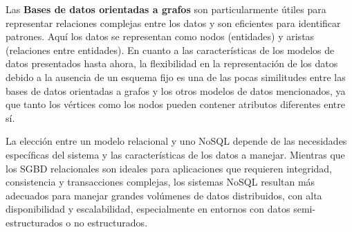 Las \textbf{Bases de datos orientadas a grafos} son particularmente útiles para 
representar relaciones complejas entre los datos y son eficientes para identificar patrones. 
Aquí los datos se representan como nodos (entidades) y aristas 
(relaciones entre entidades). En cuanto a las características de los modelos 
de datos presentados hasta ahora, la flexibilidad en la representación de los datos debido 
a la ausencia de un esquema fijo es una de las pocas similitudes entre las bases de 
datos orientadas a grafos y los otros modelos de datos mencionados, ya que tanto 
los vértices como los nodos pueden contener atributos diferentes entre sí.

La elección entre un modelo relacional y uno NoSQL depende de las necesidades específicas 
del sistema y las características de los datos a manejar. Mientras que los SGBD 
relacionales son ideales para aplicaciones que requieren integridad, consistencia y 
transacciones complejas, los sistemas NoSQL resultan más adecuados para manejar 
grandes volúmenes de datos distribuidos, con alta disponibilidad y escalabilidad, 
especialmente en entornos con datos semi-estructurados o no estructurados.

